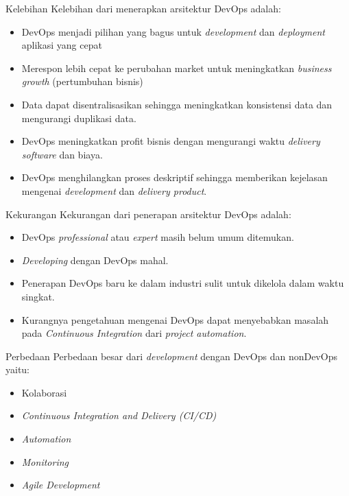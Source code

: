 \documentclass[aspectratio=169, table]{beamer}
\begin{document}
	\begin{frame}{Kelebihan}
        \vspace{20pt}
		Kelebihan dari menerapkan arsitektur DevOps adalah:
		\begin{itemize}
			\item DevOps menjadi pilihan yang bagus untuk \textit{development} dan \textit{deployment} aplikasi yang cepat
			\item Merespon lebih cepat ke perubahan market untuk meningkatkan \textit{business growth} (pertumbuhan bisnis)
			\item Data dapat disentralisasikan sehingga meningkatkan konsistensi data dan mengurangi duplikasi data.
			\item DevOps meningkatkan profit bisnis dengan mengurangi waktu \textit{delivery software} dan biaya.
			\item DevOps menghilangkan proses deskriptif sehingga memberikan kejelasan mengenai \textit{development} dan \textit{delivery product}.

		\end{itemize}
	\end{frame}

	\begin{frame}{Kekurangan}
		Kekurangan dari penerapan arsitektur DevOps adalah:
		\begin{itemize}
			\item DevOps \textit{professional} atau \textit{expert} masih belum umum ditemukan.
			\item \textit{Developing} dengan DevOps mahal.
			\item Penerapan DevOps baru ke dalam industri sulit untuk dikelola dalam waktu singkat.
			\item 	Kurangnya pengetahuan mengenai DevOps dapat menyebabkan masalah pada \textit{Continuous Integration} dari \textit{project automation}.
		\end{itemize}
	\end{frame}

	\begin{frame}{Perbedaan}
		Perbedaan besar dari \textit{development} dengan DevOps dan nonDevOps yaitu:
		\begin{itemize}
			\item Kolaborasi
			\item \textit{Continuous Integration and Delivery (CI/CD)}
			\item \textit{Automation}
			\item \textit{Monitoring}
			\item \textit{Agile Development}
		\end{itemize}
	\end{frame}
\end{document}
